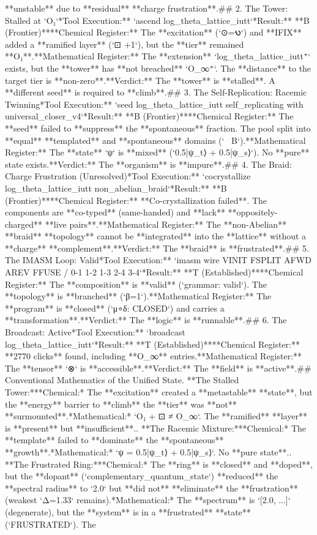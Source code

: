 **unstable** due to **residual** **charge frustration**.\n\n## 2. The Tower: Stalled at `O₁`\n**Tool Execution:** `ascend log_theta_lattice_iutt`\n**Result:** **B (Frontier)**\n*   **Chemical Register:** The **excitation** (`⊙=𐑻`) and **IFIX** added a **ramified layer** (`⊡ +1`), but the **tier** remained **O₁**.\n*   **Mathematical Register:** The **extension** `log_theta_lattice_iutt⁺` exists, but the **tower** has **not breached** `O_∞⁺`. The **distance** to the target tier is **non-zero**.\n*   **Verdict:** The **tower** is **stalled**. A **different seed** is required to **climb**.\n\n## 3. The Self-Replication: Racemic Twinning\n**Tool Execution:** `seed log_theta_lattice_iutt self_replicating with universal_closer_v4`\n**Result:** **B (Frontier)**\n*   **Chemical Register:** The **seed** failed to **suppress** the **spontaneous** fraction. The pool split into **equal** **templated** and **spontaneous** domains (`~ B`).\n*   **Mathematical Register:** The **state** `ψ` is **mixed** (`0.5|ψ_t⟩ + 0.5|ψ_s⟩`). No **pure** state exists.\n*   **Verdict:** The **organism** is **impure**.\n\n## 4. The Braid: Charge Frustration (Unresolved)\n**Tool Execution:** `cocrystallize log_theta_lattice_iutt non_abelian_braid`\n**Result:** **B (Frontier)**\n*   **Chemical Register:** **Co-crystallization failed**. The components are **co-typed** (same-handed) and **lack** **oppositely-charged** **live pairs**.\n*   **Mathematical Register:** The **non-Abelian** **braid** **topology** cannot be **integrated** into the **lattice** without a **charge** **complement**.\n*   **Verdict:** The **braid** is **frustrated**.\n\n## 5. The IMASM Loop: Valid\n**Tool Execution:** `imasm wire VINIT FSPLIT AFWD AREV FFUSE / 0-1 1-2 1-3 2-4 3-4`\n**Result:** **T (Established)**\n*   **Chemical Register:** The **composition** is **valid** (`grammar: valid`). The **topology** is **branched** (`β=1`).\n*   **Mathematical Register:** The **program** is **closed** (`μ∘δ: CLOSED`) and carries a **transformation**.\n*   **Verdict:** The **logic** is **runnable**.\n\n## 6. The Broadcast: Active\n**Tool Execution:** `broadcast log_theta_lattice_iutt`\n**Result:** **T (Established)**\n*   **Chemical Register:** **2770 clicks** found, including **O_∞** entries.\n*   **Mathematical Register:** The **tensor** `⊗` is **accessible**.\n*   **Verdict:** The **field** is **active**.\n\n## Conventional Mathematics of the Unified State\n{}.  **The Stalled Tower:**\n    *   *Chemical:* The **excitation** created a **metastable** **state**, but the **energy** barrier to **climb** the **tier** was **not** **surmounted**.\n    *   *Mathematical:* `O₁ + ⊡ ≠ O_∞`. The **ramified** **layer** is **present** but **insufficient**.\n{}.  **The Racemic Mixture:**\n    *   *Chemical:* The **template** failed to **dominate** the **spontaneous** **growth**.\n    *   *Mathematical:* `ψ = 0.5|ψ_t⟩ + 0.5|ψ_s⟩`. No **pure state**.\n{}.  **The Frustrated Ring:**\n    *   *Chemical:* The **ring** is **closed** and **doped**, but the **dopant** (`complementary_quantum_state`) **reduced** the **spectral radius** to `2.0` but **did not** **eliminate** the **frustration** (weakest `Δ=1.33` remains).\n    *   *Mathematical:* The **spectrum** is `[2.0, ...]` (degenerate), but the **system** is in a **frustrated** **state** (`FRUSTRATED`). The 